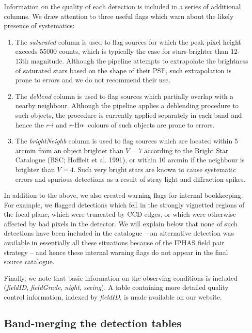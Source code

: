 \documentclass[useAMS,usenatbib]{mn2e}
\def\ha{\mbox{H$\rm \alpha$}}
\begin{document}
Information on the quality of each detection is included 
in a series of additional columns.
We draw attention to three useful flags
which warn about the likely presence of systematics:
\begin{enumerate}
\item The \emph{saturated} column is used to flag sources
for which the peak pixel height exceeds 55000 counts,
which is typically the case for stars brighter than 12-13th magnitude.
Although the pipeline attempts to extrapolate the brightness of
saturated stars based on the shape of their PSF,
such extrapolation is prone to errors
and we do not recommend their use.
\item The \emph{deblend} column is used to flag sources 
which partially overlap with a nearby neighbour.
Although the pipeline applies a deblending procedure
to such objects, the procedure is currently applied separately
in each band and hence the $r$-$i$ and $r$-\ha\ colours
of such objects are prone to errors.
\item The \emph{brightNeighb} column is used to flag sources which are located
within 5 arcmin from an object brighter than $V=7$ 
according to the Bright Star Catalogue (BSC; Hoffleit et al. 1991), 
or within 10 arcmin if the neighbour is brighter than $V=4$.
Such very bright stars are known to cause systematic errors
and spurious detections as a result of stray light 
and diffraction spikes.
\end{enumerate}
In addition to the above, we also created warning flags for internal bookkeeping.
For example, we flagged detections which fell in the strongly vignetted regions of the focal plane,
which were truncated by CCD edges,
or which were otherwise affected by bad pixels in the detector.
We will explain below that none of such detections 
have been included in the catalogue
-- an alternative detection was available in essentially all these situations
because of the IPHAS field pair strategy --
and hence these internal warning flags do not appear
in the final source catalogue.

Finally, we note that basic information on the observing conditions
is included (\emph{fieldID}, \emph{fieldGrade}, \emph{night}, \emph{seeing}).
A table containing more detailed quality control information,
indexed by \emph{fieldID}, is made available on our website.

\subsection{Band-merging the detection tables}
\end{document}
